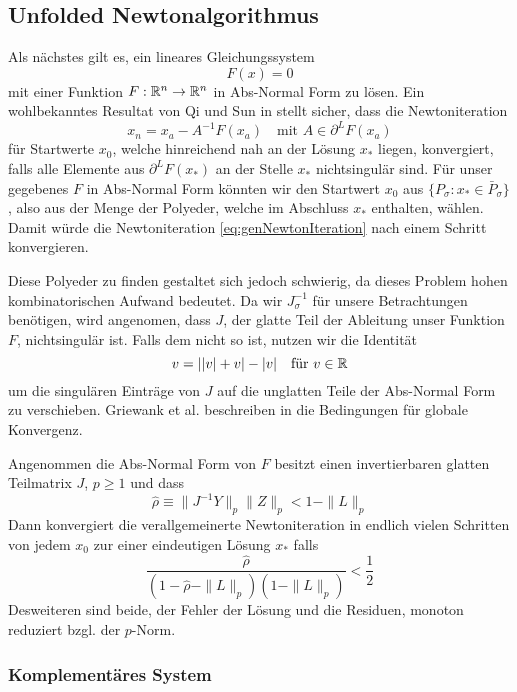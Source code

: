 \subsection{Unfolded Newtonalgorithmus}
Als nächstes gilt es, ein lineares Gleichungssystem 
\[
 F(x) = 0
\]
mit einer Funktion  $F:\mathbb{R}^n \to \mathbb{R}^n$ in Abs-Normal Form zu lösen.
Ein wohlbekanntes Resultat von Qi und Sun in \cite{qi1993nonsmooth} stellt sicher, dass die Newtoniteration
\begin{equation}
\label{eq:genNewtonIteration}
 x_n = x_a- A^{-1}F(x_a)\quad \text{mit } A \in \partial^LF(x_a)
\end{equation}
für Startwerte $x_0$, welche hinreichend nah an der Lösung $x_*$ liegen, konvergiert, falls alle Elemente aus $\partial^L F(x_*)$ an der Stelle $x_*$ nichtsingulär sind. 
Für unser gegebenes $F$ in Abs-Normal Form könnten wir den Startwert $x_0$ aus $\lbrace P_\sigma:x_*\in \bar P_\sigma \rbrace$, also aus der Menge der Polyeder, welche im Abschluss  $x_*$ enthalten, wählen. Damit würde die Newtoniteration \eqref{eq:genNewtonIteration} nach einem Schritt konvergieren. 

Diese Polyeder zu finden gestaltet sich jedoch schwierig, da dieses Problem hohen kombinatorischen Aufwand bedeutet. 
Da wir $J_\sigma^{-1}$ für unsere Betrachtungen benötigen, wird angenomen, dass $J$, der glatte Teil der Ableitung unser Funktion $F$, nichtsingulär ist. Falls dem nicht so ist, nutzen wir die Identität
\[
 v = | |v| + v| - |v | \quad \text{für } v\in\mathbb{R}
\]
um die singulären Einträge von $J$ auf die unglatten Teile der Abs-Normal Form zu verschieben.
Griewank et al. beschreiben in \cite[Prop.5.2]{plan} die Bedingungen für globale Konvergenz.

\begin{theorem}
 Angenommen die Abs-Normal Form von $F$ besitzt einen invertierbaren glatten Teilmatrix $J$, $p\geq 1$ und dass
 \[
  \hat \rho \equiv \| J^{-1}Y \|_p \|Z\|_p < 1 - \|L\|_p
 \]
 Dann konvergiert die verallgemeinerte Newtoniteration in endlich vielen Schritten von jedem $x_0$ zur einer eindeutigen Lösung $x_*$ falls
 \[
  \frac{\hat \rho}{(1-\hat \rho - \|L\|_p)(1-\|L\|_p)} < \frac{1}{2}
 \]
Desweiteren sind beide, der Fehler der Lösung und die Residuen, monoton reduziert bzgl. der $p$-Norm.
\end{theorem}

\subsubsection{Komplementäres System}

